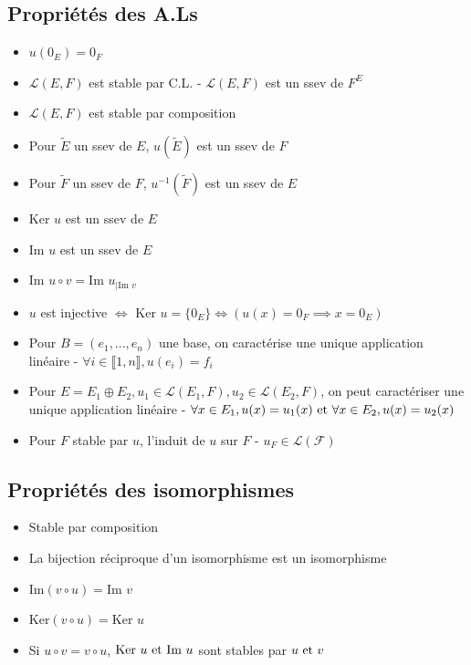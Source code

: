 \documentclass[openany]{book}
\begin{document}
\subsection{Propriétés des A.Ls}
\begin{itemize}
    \item $u(0_E) = 0_F$
    \item $\mathcal{L}(E, F)$ est stable par C.L. - $\mathcal{L}(E, F)$ est un ssev de $F^E$
    \item $\mathcal{L}(E, F)$ est stable par composition
    \item Pour $\tilde{E}$ un ssev de $E$, $u(\tilde{E})$ est un ssev de $F$
    \item Pour $\tilde{F}$ un ssev de $F$, $u^{-1}(\tilde{F})$ est un ssev de $E$
    \item $\text{Ker } u $ est un ssev de $E$
    \item $\text{Im } u $ est un ssev de $E$
    \item $\text{Im } u \circ v  = \text{Im } u_{|\text{Im }v}$ 
    \item $u$ est injective $\iff$ $\text{Ker }u = \{0_E\} \iff (u(x) = 0_F \implies x = 0_E)$
    \item Pour $B = (e_1,...,e_n)$ une base, on caractérise une unique application linéaire - $ \forall i \in \llbracket 1, n \rrbracket, u(e_i) = f_i $
    \item Pour $ E = E_1 \oplus E_2, u_1 \in \mathcal{L}(E_1, F), u_2 \in \mathcal{L}(E_2, F) $, on peut caractériser une unique application linéaire - $ \forall x \in E_1, u(x) = u_1(x) \text{ et } \forall x \in E_2, u(x) = u_2(x) $
    \item Pour $F$ stable par $u$, l'induit de $u$ sur $F$ - $u_F \in \mathcal{L(F)}$
\end{itemize}

\subsection{Propriétés des isomorphismes}
\begin{itemize}
    \item Stable par composition
    \item La bijection réciproque d'un isomorphisme est un isomorphisme
    \item $ \text{Im}(v \circ u) = \text{Im } v $
    \item $ \text{Ker}(v \circ u) = \text{Ker } u $
    \item Si $u \circ v = v \circ u$, $\text{Ker }u \text{ et } \text{Im }u$ sont stables par $u \text{ et } v$
\end{itemize}
\end{document}
